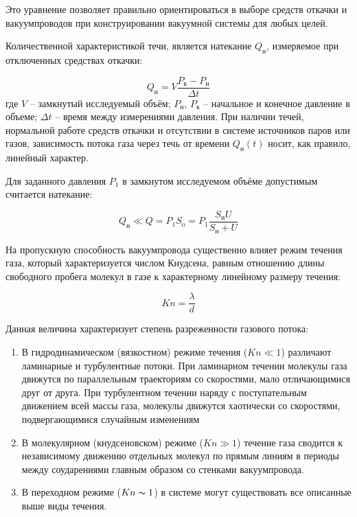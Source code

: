 \documentclass[a4paper, 12pt]{article} %
\begin{document}
Это уравнение позволяет правильно ориентироваться в выборе средств
откачки и вакуумпроводов при конструировании вакуумной системы для
любых целей.

Количественной характеристикой течи, является натекание $Q_{\text{н}}$, измеряемое при отключенных средствах откачки:

\begin{equation}
	Q_{\text{н}} = V \frac{P_{\text{к}} - P_{\text{н}}}{\Delta t}
\end{equation}
где $V$ -- замкнутый исследуемый объём; $P_{\text{н}}$, $P_{\text{к}}$ -- начальное и конечное давление в объеме; $\Delta t$ -- время между измерениями давления. При наличии течей, нормальной работе средств откачки и отсутствии в системе
источников паров или газов, зависимость потока газа через течь от времени $Q_{\text{н}}(t)$ носит, как правило, линейный характер.

Для заданного давления $P_1$ в замкнутом исследуемом объёме допустимым считается натекание:

\begin{equation}
	Q_{\text{н}} \ll Q = P_1 S_{\text{o}} = P_1 \frac{S_{\text{н}} U}{S_{\text{н}} + U}
\end{equation}

На пропускную способность вакуумпровода существенно влияет
режим течения газа, который характеризуется числом Кнудсена, равным
отношению длины свободного пробега молекул в газе к характерному
линейному размеру течения:

\begin{equation}
	Kn = \frac{\lambda}{d}
\end{equation}

Данная величина характеризует степень разреженности газового
потока:
\begin{enumerate}

	\item В гидродинамическом (вязкостном) режиме течения ($Kn \ll 1$)
различают ламинарные и турбулентные потоки. При ламинарном
течении молекулы газа движутся по параллельным траекториям
со скоростями, мало отличающимися друг от друга. При турбулентном течении наряду с поступательным движением всей массы газа, молекулы движутся хаотически со скоростями, подвергающимися случайным изменениям

	\item В молекулярном (кнудсеновском) режиме ($Kn \gg 1$) течение газа
сводится к независимому движению отдельных молекул по прямым линиям в периоды между соударениями главным образом со
стенками вакуумпровода.

	\item В переходном режиме ($Kn \thicksim 1$) в системе могут существовать все
описанные выше виды течения.

\end{enumerate}
\end{document}
